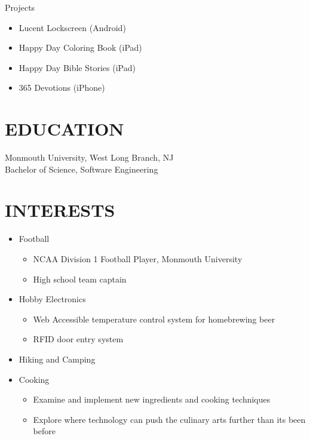 \documentclass{res}
\begin{document}
\begin{resume}
    Projects
    \begin{itemize}
        \item Lucent Lockscreen (Android)
        \item Happy Day Coloring Book (iPad)
        \item Happy Day Bible Stories (iPad)
        \item 365 Devotions (iPhone)
    \end{itemize}


\section{EDUCATION}          
    Monmouth University, West Long Branch, NJ  \\        
    Bachelor of Science, Software Engineering   \\       


\section{INTERESTS}          
    \begin{itemize}
        \item Football
            \begin{itemize}
                \item NCAA Division 1 Football Player, Monmouth University
                \item High school team captain
            \end{itemize}
        \item Hobby Electronics
            \begin{itemize}
                \item Web Accessible temperature control system for homebrewing beer
                \item RFID door entry system
            \end{itemize}
        \item Hiking and Camping
        \item Cooking
          \begin{itemize}
            \item Examine and implement new ingredients and cooking techniques
            \item Explore where technology can push the culinary arts further than its been before
          \end{itemize}
    \end{itemize}
 


\end{resume}
\end{document}
